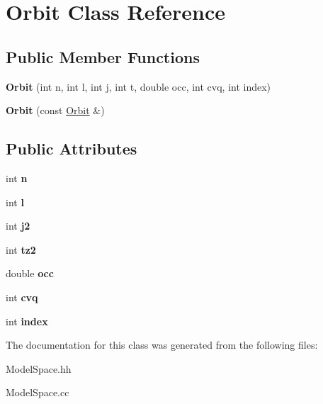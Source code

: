 \hypertarget{classOrbit}{}\section{Orbit Class Reference}
\label{classOrbit}
\subsection*{Public Member Functions}
\begin{DoxyCompactItemize}
\item 
{\bfseries Orbit} (int n, int l, int j, int t, double occ, int cvq, int index)\hypertarget{classOrbit_a9df0d8fc6d6dd366b7fd11be3d6a40e0}{}\label{classOrbit_a9df0d8fc6d6dd366b7fd11be3d6a40e0}

\item 
{\bfseries Orbit} (const \hyperlink{classOrbit}{Orbit} \&)\hypertarget{classOrbit_acc12b8fdfccd5dc2aacbf06baa7a9d03}{}\label{classOrbit_acc12b8fdfccd5dc2aacbf06baa7a9d03}

\end{DoxyCompactItemize}
\subsection*{Public Attributes}
\begin{DoxyCompactItemize}
\item 
int {\bfseries n}\hypertarget{classOrbit_a61c756b2fd626b9222fea5a2b4622eca}{}\label{classOrbit_a61c756b2fd626b9222fea5a2b4622eca}

\item 
int {\bfseries l}\hypertarget{classOrbit_a3b03c063df7856524db81274331d0e4b}{}\label{classOrbit_a3b03c063df7856524db81274331d0e4b}

\item 
int {\bfseries j2}\hypertarget{classOrbit_a039f1fb20d41a2227bb61c2078e67d8b}{}\label{classOrbit_a039f1fb20d41a2227bb61c2078e67d8b}

\item 
int {\bfseries tz2}\hypertarget{classOrbit_a9f9a4be881aa8b960b43fb3171617816}{}\label{classOrbit_a9f9a4be881aa8b960b43fb3171617816}

\item 
double {\bfseries occ}\hypertarget{classOrbit_a68ea77afa00c23030e1c4260ff64dcbc}{}\label{classOrbit_a68ea77afa00c23030e1c4260ff64dcbc}

\item 
int {\bfseries cvq}\hypertarget{classOrbit_a75cb422d6cd5fcc04ca5e2dc2c1e1d4e}{}\label{classOrbit_a75cb422d6cd5fcc04ca5e2dc2c1e1d4e}

\item 
int {\bfseries index}\hypertarget{classOrbit_aee34aabfabd6d77cb0cc55f591a6493c}{}\label{classOrbit_aee34aabfabd6d77cb0cc55f591a6493c}

\end{DoxyCompactItemize}


The documentation for this class was generated from the following files\+:\begin{DoxyCompactItemize}
\item 
Model\+Space.\+hh\item 
Model\+Space.\+cc\end{DoxyCompactItemize}
